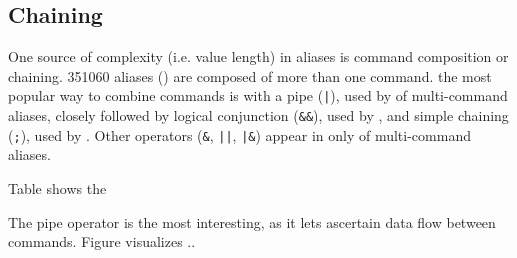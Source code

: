 \subsection{Chaining}

One source of complexity (i.e. value length) in aliases is command composition or chaining.
\num{351060} aliases () are composed of more than one command.
the most popular way to combine commands is with a pipe (\verb!|!), used by  of multi-command aliases, closely followed by logical conjunction (\verb|&&|), used by , and simple chaining (\verb|;|), used by .
Other operators (\verb|&|, \verb!||!, \verb!|&!) appear in only  of multi-command aliases.

Table \TODO shows the 


The pipe operator is the  most interesting, as it lets ascertain data flow between commands.
Figure \TODO visualizes ..
